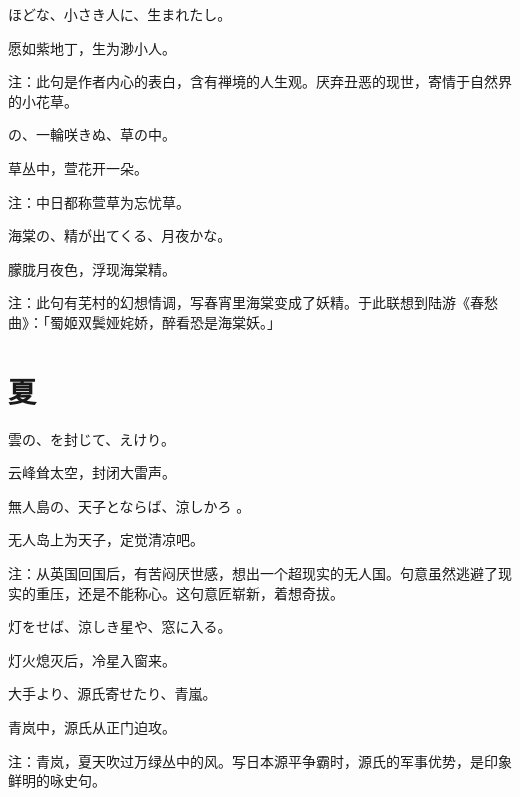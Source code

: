\begin{haiku}
    {\FH {}ほどな、小さき人に、生まれたし。}

    {\FK 愿如紫地丁，生为渺小人。}

    {\FT 注：此句是作者内心的表白，含有禅境的人生观。厌弃丑恶的现世，寄情于自然界的小花草。}
\end{haiku}

\begin{haiku}
    {\FH {}の、一輪咲きぬ、草の中。}

    {\FK 草丛中，萱花开一朵。}

    {\FT 注：中日都称萱草为忘忧草。}
\end{haiku}

\begin{haiku}
    {\FH 海棠の、精が出てくる、月夜かな。}

    {\FK 朦胧月夜色，浮现海棠精。}

    {\FT 注：此句有芜村的幻想情调，写春宵里海棠变成了妖精。于此联想到陆游《春愁曲》：「蜀姬双鬓娅姹娇，醉看恐是海棠妖。」}
\end{haiku}

\section{\FK 夏}

\setcounter{haikucounter}{0}

\begin{haiku}
    {\FH 雲の、を封じて、えけり。}

    {\FK 云峰耸太空，封闭大雷声。}
\end{haiku}

\begin{haiku}
    {\FH 無人島の、天子とならば、涼しかろ
        。}

    {\FK 无人岛上为天子，定觉清凉吧。}

    {\FT 注：从英国回国后，有苦闷厌世感，想出一个超现实的无人国。句意虽然逃避了现实的重压，还是不能称心。这句意匠崭新，着想奇拔。}
\end{haiku}

\begin{haiku}
    {\FH 灯をせば、涼しき星や、窓に入る。}

    {\FK 灯火熄灭后，冷星入窗来。}
\end{haiku}

\begin{haiku}
    {\FH 大手より、源氏寄せたり、青嵐。}

    {\FK 青岚中，源氏从正门迫攻。}

    {\FT 注：青岚，夏天吹过万绿丛中的风。写日本源平争霸时，源氏的军事优势，是印象鲜明的咏史句。}
\end{haiku}

